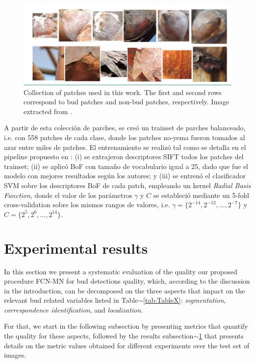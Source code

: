 \documentclass[a4paper,authoryear,review]{elsarticle}
\begin{document}
\begin{figure}
    \centering
    \includegraphics[width=12cm]{figures/Figure2.png}
    \caption{Collection of patches used in this work. The first and second rows correspond to bud patches and non-bud patches, respectively. Image extracted from \citet{perez2017image}.}
    \label{fig:Figure2}
\end{figure}

A partir de esta colección de parches, se creó un trainset de parches balanceado, i.e. con 558 patches de cada clase, donde los patches no-yema fueron tomados al azar entre miles de patches. El entrenamiento se realizó tal como se detalla en el pipeline propuesto en \citet{perez2017image}: (i) se extrajeron descriptores SIFT todos los patches del trainset; (ii) se aplicó BoF con tamaño de vocabulario igual a 25, dado que fue el modelo con mejores resultados según los autores; y (iii) se entrenó el clasificador SVM sobre los descriptores BoF de cada patch, empleando un kernel \emph{Radial Basis Function}, donde el valor de los parámetros $\gamma$ y $C$ se estableció mediante un 5-fold cross-validation sobre los mismos rangos de valores, i.e. $\gamma = \{2^{-14}, 2^{-13}, \ldots, 2^{-7}\}$ y $C = \{2^{5}, 2^{6},\ldots , 2^{14}\}$.


\section{Experimental results} \label{sec:results}

In this section we present a systematic evaluation of the quality our proposed procedure FCN-MN for bud detections quality, which, according to the discussion in the introduction, can be decomposed on the three aspects that impact on the relevant bud related variables listed in Table$\sim$\ref{tab:TableX}: \emph{segmentation}, \emph{correspondence identification}, and \emph{localization}. 

%
For that, we start in the following subsection by presenting metrics that quantify the quality for these aspects, followed by the results subsection$\sim$\ref{sec:results} that presents details on the metric values obtained for different experiments over the test set of images. 
\end{document}

